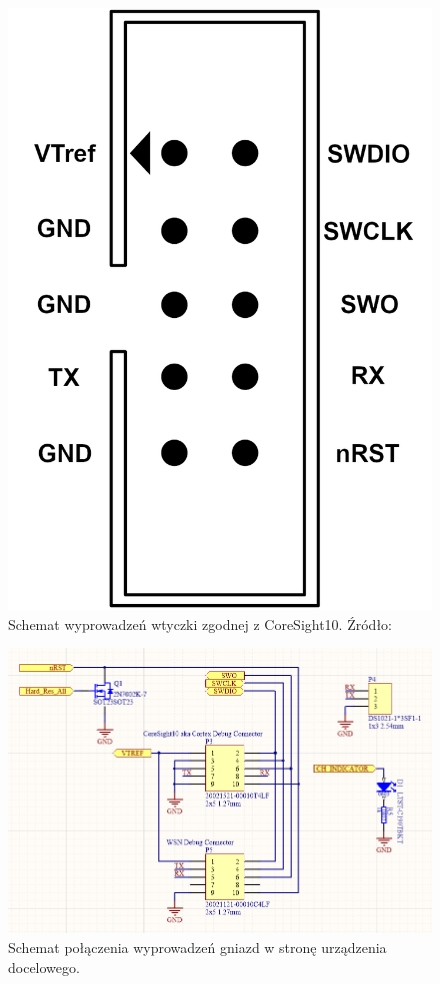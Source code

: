 \begin{figure}[H]
\begin{minipage}[b]{0.4\textwidth}
    \includegraphics[height=0.4\paperwidth]{images/CoreSight10.png}
    \caption{Schemat wyprowadzeń wtyczki zgodnej z CoreSight10. Źródło:\cite{CoreSight10_documentation} }
    \label{CoreSight10_capable_Connector}
  \end{minipage}
\end{figure}

\begin{figure}[H]
    \centering
    \includegraphics[width=0.75\paperwidth]{images/target_connectors.png}
    \caption{Schemat połączenia wyprowadzeń gniazd w stronę urządzenia docelowego.}
    \label{target_connectors}
\end{figure}



